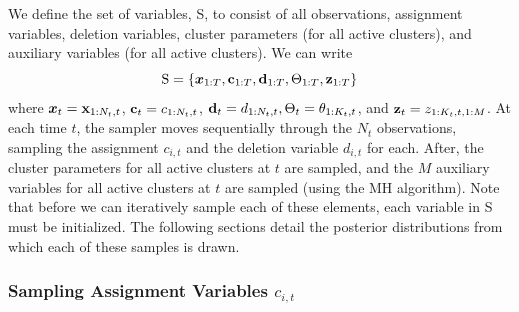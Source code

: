 \documentclass[twocolumn, final]{svjour3}
\begin{document}
We define the set of variables, S, to consist of all observations, assignment variables, deletion variables, cluster parameters (for all active clusters), and auxiliary variables (for all active clusters). We can write
\begin{equation}
\text{S} = \{ \boldsymbol{x}_{1:T}, \bold{c}_{1:T}, \bold{d}_{1:T}, \Theta_{1:T}, \bold{z}_{1:T} \}
\end{equation}
where $\boldsymbol{x}_{t} = \bold{x}_{1:N_{t},t}$, $\bold{c}_{t} = c_{1:N_{t},t}$, $\bold{d}_{t} = d_{1:N_{t},t}, \Theta_{t} = \theta_{1:K_{t}, t}$, and $\bold{z}_{t} = z_{1:K_{t},t,1:M}$.
At each time $t$, the sampler moves sequentially through the $N_{t}$ observations, sampling the assignment $c_{i,t}$ and the deletion variable $d_{i,t}$ for each. After, the cluster parameters for all active clusters at $t$ are sampled, and the $M$ auxiliary variables for all active clusters at $t$ are sampled (using the MH algorithm). Note that before we can iteratively sample each of these elements, each variable in S must be initialized. The following sections detail the posterior distributions from which each of these samples is drawn.



\subsubsection{Sampling Assignment Variables $c_{i,t}$}
\label{sec:sample_assignments}
\end{document}
